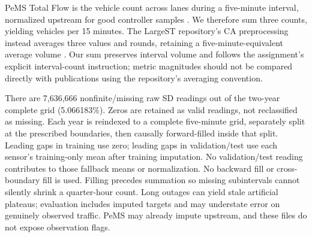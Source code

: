 \documentclass[11pt,a4paper]{article}
\begin{document}
PeMS Total Flow is the vehicle count across lanes during a five-minute interval, normalized upstream for good controller samples \cite{pems}. We therefore sum three counts, yielding vehicles per 15 minutes. The LargeST repository's CA preprocessing instead averages three values and rounds, retaining a five-minute-equivalent average volume \cite{repo}. Our sum preserves interval volume and follows the assignment's explicit interval-count instruction; metric magnitudes should not be compared directly with publications using the repository's averaging convention.

There are 7,636,666 nonfinite/missing raw SD readings out of the two-year complete grid (5.066183\%). Zeros are retained as valid readings, not reclassified as missing. Each year is reindexed to a complete five-minute grid, separately split at the prescribed boundaries, then causally forward-filled inside that split. Leading gaps in training use zero; leading gaps in validation/test use each sensor’s training-only mean after training imputation. No validation/test reading contributes to those fallback means or normalization. No backward fill or cross-boundary fill is used. Filling precedes summation so missing subintervals cannot silently shrink a quarter-hour count. Long outages can yield stale artificial plateaus; evaluation includes imputed targets and may understate error on genuinely observed traffic. PeMS may already impute upstream, and these files do not expose observation flags.
\end{document}
